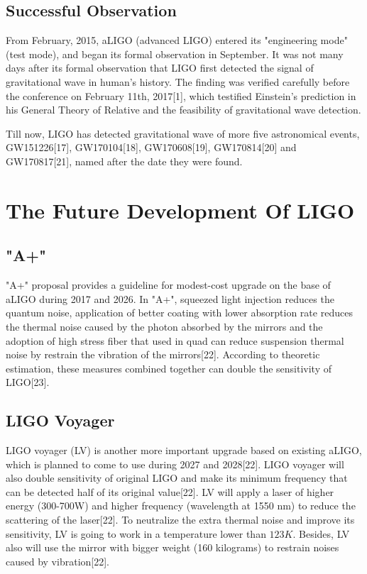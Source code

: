 \documentclass[journal,comsoc,twoside]{IEEEtran}
\begin{document}
\subsection{Successful Observation}
From February, 2015, aLIGO (advanced LIGO) entered its "engineering mode" (test mode), and began its formal observation in September. It was not many days after its formal observation that LIGO first detected the signal of gravitational wave in human's history. The finding was verified carefully before the conference on February 11th, 2017[1], which testified Einstein's prediction in his General Theory of Relative and the feasibility of gravitational wave detection.

Till now, LIGO has detected gravitational wave of more five astronomical events, GW151226[17], GW170104[18], GW170608[19], GW170814[20] and GW170817[21], named after the date they were found.
\section{The Future Development Of LIGO}
\subsection{"A+"}
"A+" proposal provides a guideline for modest-cost upgrade on the base of aLIGO during 2017 and 2026. In "A+", squeezed light injection reduces the quantum noise, application of better coating with lower absorption rate reduces the thermal noise caused by the photon absorbed by the mirrors and the adoption of high stress fiber that used in quad can reduce suspension thermal noise by restrain the vibration of the mirrors[22]. According to theoretic estimation, these measures combined together can double the sensitivity of LIGO[23].
\subsection{LIGO Voyager}
LIGO voyager (LV) is another more important upgrade based on existing aLIGO, which is planned to come to use during 2027 and 2028[22]. LIGO voyager will also double sensitivity of original  LIGO and make its minimum frequency that can be detected half of its original value[22]. LV will apply a laser of higher energy (300-700W) and higher frequency (wavelength at 1550 nm) to reduce the scattering of the laser[22]. To neutralize the extra thermal noise and improve its sensitivity, LV is going to work in a temperature lower than $123K$. Besides, LV also will use the mirror with bigger weight (160 kilograms) to restrain noises caused by vibration[22].
\end{document}
